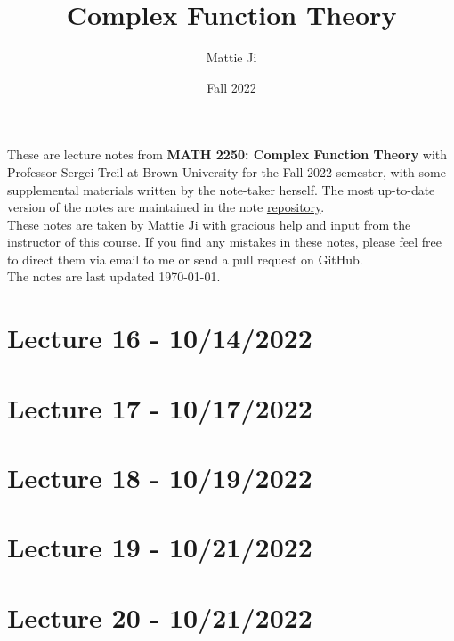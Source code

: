 \documentclass{article}
\title{Complex Function Theory}
\author{Mattie Ji}
\date{Fall 2022}
\begin{document}
\maketitle
These are lecture notes from \textbf{MATH 2250: Complex Function Theory} with Professor Sergei Treil at Brown University for the Fall 2022 semester, with some supplemental materials written by the note-taker herself. The most up-to-date version of the notes are maintained in the note \href{https://github.com/maroon-scorch/MATH2550-notes}{repository}.\\

These notes are taken by \href{https://github.com/maroon-scorch}{Mattie Ji} with gracious help and input from the instructor of this course. If you find any mistakes in these notes, please feel free to direct them via email to me or send a pull request on GitHub.\\

The notes are last updated \today.
\tableofcontents
\newpage

















\section{Lecture 16 - 10/14/2022}

\section{Lecture 17 - 10/17/2022}

\section{Lecture 18 - 10/19/2022}

\section{Lecture 19 - 10/21/2022}

\section{Lecture 20 - 10/21/2022}
\end{document}
